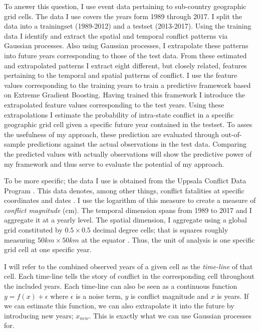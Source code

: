 \documentclass[a4paper]{article}
\begin{document}
To answer this question, I use event data pertaining to sub-country geographic grid cells. The data I use covers the years form 1989 through 2017. I split the data into a trainingset (1989-2012) and a testset (2013-2017). Using the training data I identify and extract the spatial and temporal conflict patterns via Gaussian processes. Also using Gaussian processes, I extrapolate these patterns into future years corresponding to those of the test data. From these estimated and extrapolated patterns I extract eight different, but closely related, features pertaining to the temporal and spatial patterns of conflict. I use the feature values corresponding to the training years to train a predictive framework based on Extreme Gradient Boosting. Having trained this framework I introduce the extrapolated feature values corresponding to the test years. Using these extrapolations I estimate the probability of intra-state conflict in a specific geographic grid cell given a specific future year contained in the testset. To asses the usefulness of my approach, these prediction are evaluated through out-of-sample predictions against the actual observations in the test data. Comparing the predicted values with actually observations will show the predictive power of my framework and thus serve to evaluate the potential of my approach.\par

To be more specific; the data I use is obtained from the Uppsala Conflict Data Program \citep{UCDP_2017}. This data denotes, among other things, conflict fatalities at specific coordinates and dates \citep{UCDP_2017}. I use the logarithm of this measure to create a measure of \emph{conflict magnitude} (cm). The temporal dimension spans from 1989 to 2017 and I aggregate it at a yearly level. The spatial dimension, I aggregate using a global grid constituted by $0.5 \times 0.5$ decimal degree cells; that is squares roughly measuring $50km\times50km$ at the equator \citep[367]{Tollefsen_2012}. Thus, the unit of analysis is one specific grid cell at one specific year.\par

I will refer to the combined observed years of a given cell as the \emph{time-line} of that cell. Each time-line tells the story of conflict in the corresponding cell throughout the included years. Each time-line can also be seen as a continuous function $y = f(x) + \epsilon$ where $\epsilon$ is a noise term, $y$ is conflict magnitude and $x$ is years. If we can estimate this function, we can also extrapolate it into the future by introducing new years; $x_{new}$. This is exactly what we can use Gaussian processes for.\par
\end{document}
